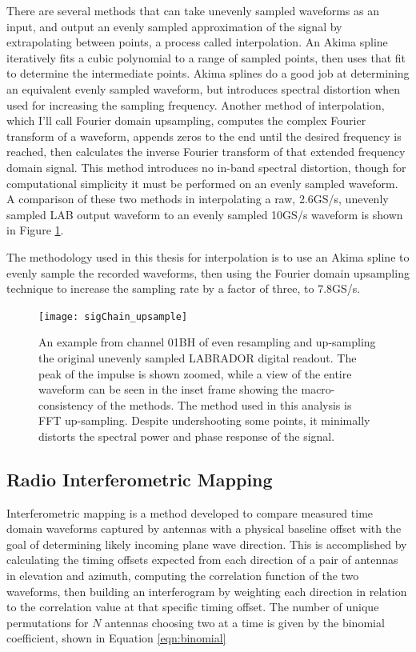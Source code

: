 		There are several methods that can take unevenly sampled waveforms as an input, and output an evenly sampled approximation of the signal by extrapolating between points, a process called interpolation.  An Akima spline iteratively fits a cubic polynomial to a range of sampled points, then uses that fit to determine the intermediate points.  Akima splines do a good job at determining an equivalent evenly sampled waveform, but introduces spectral distortion when used for increasing the sampling frequency.  Another method of interpolation, which I'll call Fourier domain upsampling, computes the complex Fourier transform of a waveform, appends zeros to the end until the desired frequency is reached, then calculates the inverse Fourier transform of that extended frequency domain signal.  This method introduces no in-band spectral distortion, though for computational simplicity it must be performed on an evenly sampled waveform.  A comparison of these two methods in interpolating a raw, 2.6GS/s, unevenly sampled LAB output waveform to an evenly sampled 10GS/s waveform is shown in Figure \ref{fig:interpolation}.
		
		The methodology used in this thesis for interpolation is to use an Akima spline to evenly sample the recorded waveforms, then using the Fourier domain upsampling technique to increase the sampling rate by a factor of three, to 7.8GS/s.
		
\begin{figure}
\centering
	\texttt{[image: sigChain\_upsample]}
	\caption{An example from channel 01BH of even resampling and up-sampling the original unevenly sampled LABRADOR digital readout.  The peak of the impulse is shown zoomed, while a view of the entire waveform can be seen in the inset frame showing the macro-consistency of the methods.  The method used in this analysis is  FFT up-sampling.  Despite undershooting some points, it minimally distorts the spectral power and phase response of the signal.}
\label{fig:interpolation}
\end{figure}		
	
	\subsection{Radio Interferometric Mapping}
		Interferometric mapping is a method developed to compare measured time domain waveforms captured by antennas with a physical baseline offset with the goal of determining likely incoming plane wave direction.\cite{interferometry}  This is accomplished by calculating the timing offsets expected from each direction of a pair of antennas in elevation and azimuth, computing the correlation function of the two waveforms, then building an interferogram by weighting each direction in relation to the correlation value at that specific timing offset.  The number of unique permutations for $N$ antennas choosing two at a time is given by the binomial coefficient, shown in Equation \ref{eqn:binomial}
		
